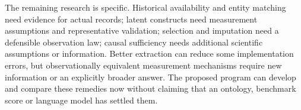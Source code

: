 The remaining research is specific. Historical availability and entity
matching need evidence for actual records; latent constructs need measurement
assumptions and representative validation; selection and imputation need a
defensible observation law; causal sufficiency needs additional scientific
assumptions or information. Better extraction can reduce some implementation
errors, but observationally equivalent measurement mechanisms require new
information or an explicitly broader answer. The proposed program can develop
and compare these remedies now without claiming that an ontology, benchmark
score or language model has settled them.
\label{exec17:ontology-end}
